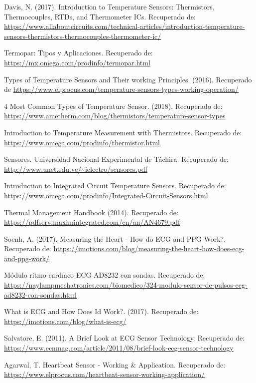 \begin{thebibliography}{0}
	 Davis, N. (2017). Introduction to Temperature Sensors: Thermistors, Thermocouples, RTDs, and Thermometer ICs. Recuperado de: \url{https://www.allaboutcircuits.com/technical-articles/introduction-temperature-sensors-thermistors-thermocouples-thermometer-ic/}
	
	 Termopar: Tipos y Aplicaciones. Recuperado de: \url{ https://mx.omega.com/prodinfo/termopar.html}
	
	 Types of Temperature Sensors and Their working Principles. (2016). Recuperado de \url{https://www.elprocus.com/temperature-sensors-types-working-operation/}
	
	 4 Most Common Types of Temperature Sensor. (2018). Recuperado de: \url{https://www.ametherm.com/blog/thermistors/temperature-sensor-types}
	
	 Introduction to Temperature Measurement with Thermistors. Recuperado de: \url{https://www.omega.com/prodinfo/thermistor.html}
	
	 Sensores. Universidad Nacional Experimental de Táchira. Recuperado de: \url{http://www.unet.edu.ve/~ielectro/sensores.pdf}
	
	 Introduction to Integrated Circuit Temperature Sensors. Recuperado de: \url{https://www.omega.com/prodinfo/Integrated-Circuit-Sensors.html}
	
	 Thermal Management Handbook (2014). Recuperado de: \url{https://pdfserv.maximintegrated.com/en/an/AN4679.pdf}
	
	 Soenh, A. (2017). Measuring the Heart - How do ECG and PPG Work?. Recuperado de: \url{https://imotions.com/blog/measuring-the-heart-how-does-ecg-and-ppg-work/}
	
	 Módulo ritmo cardíaco ECG AD8232 con sondas. Recuperado de: \url{https://naylampmechatronics.com/biomedico/324-modulo-sensor-de-pulsos-ecg-ad8232-con-sondas.html}
	
	 What is ECG and How Does Id Work?. (2017). Recuperado de: \url{https://imotions.com/blog/what-is-ecg/}
	
	 Salvatore, E. (2011). A Brief Look at ECG Sensor Technology. Recuperado de: \url{https://www.ecnmag.com/article/2011/08/brief-look-ecg-sensor-technology}
	
	 Agarwal, T. Heartbeat Sensor - Working \& Application. Recuperado de: \url{https://www.elprocus.com/heartbeat-sensor-working-application/}
	

\end{thebibliography}
